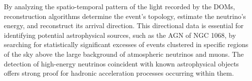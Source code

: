 By analyzing the spatio-temporal pattern of the light recorded by the DOMs, reconstruction algorithms determine the event's topology, estimate the neutrino's energy, and reconstruct its arrival direction. This directional data is essential for identifying potential astrophysical sources, such as the AGN of NGC 1068, by searching for statistically significant excesses of events clustered in specific regions of the sky above the large background of atmospheric neutrinos and muons. The detection of high-energy neutrinos coincident with known astrophysical objects offers strong proof for hadronic acceleration processes occurring within them.








